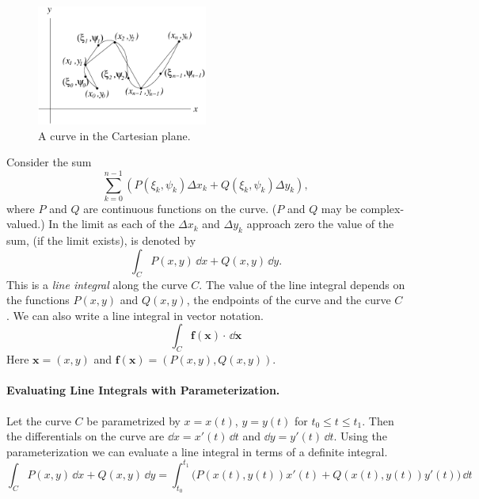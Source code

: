 \begin{figure}[htb!]
  \begin{center}
    \includegraphics[width=0.5\textwidth]{fcv/integration/cart_curve_c}
  \end{center}
  \caption{A curve in the Cartesian plane.}
  \label{cart_curve_c}
\end{figure}

Consider the sum
\[
\sum_{k = 0}^{n-1} \left( P(\xi_k, \psi_k) \Delta x_k + Q(\xi_k, \psi_k) \Delta y_k \right),
\]
where $P$ and $Q$ are continuous functions on the curve.
($P$ and $Q$ may be complex-valued.)
In the limit as each of the $\Delta x_k$ and $\Delta y_k$ approach zero
the value of the sum, (if the limit exists), is denoted by
\[
\int_C P(x,y) \,\dd x + Q(x,y)\,\dd y.
\]
This is a \textit{line integral} along the curve $C$.
The value of the line integral depends on the functions $P(x,y)$ and 
$Q(x,y)$, the endpoints of the curve and the curve $C$.
We can also write a line integral in vector notation.
\[
\int_C \mathbf{f}(\mathbf{x}) \cdot \,\dd \mathbf{x}
\]
Here $\mathbf{x} = (x, y)$ and $\mathbf{f}(\mathbf{x}) = ( P(x,y), Q(x,y) )$.





\paragraph{Evaluating Line Integrals with Parameterization.}
Let the curve $C$ be parametrized by $x = x(t)$, $y = y(t)$ for 
$t_0 \leq t \leq t_1$.  Then the differentials on the curve are
$\dd x = x'(t)\,\dd t$ and $\dd y = y'(t)\,\dd t$.
Using the parameterization we can evaluate a line integral in terms of 
a definite integral.
\[
\int_C P(x,y) \,\dd x + Q(x,y)\,\dd y = 
\int_{t_0}^{t_1} \big( P(x(t), y(t)) x'(t) + Q(x(t), y(t)) y'(t) \big)\,\dd t
\]



